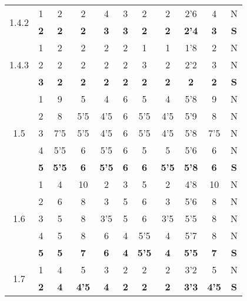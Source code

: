 \documentclass[11pt,a4paper,spanish,twoside]{report}
\begin{document}
\begin{table}[!h]
\begin{tabular}{|c|c||c|c|c|c|c||c|c|c||c|}
    \multirow{2}{*}{1.4.2} & 1 & 2 & 2 & 4 & 3 & 2 & 2 & 2'6 & 4 & N\\
    & \textbf{2} & \textbf{2} & \textbf{2} & \textbf{3} & \textbf{3} & \textbf{2} & \textbf{2} & \textbf{2'4} & \textbf{3} & \textbf{S} \\
    \hline

    \multirow{3}{*}{1.4.3} & 1 & 2 & 2 & 2 & 2 & 1 & 1 & 1'8 & 2 & N\\
    & 2 & 2 & 2 & 2 & 2 & 3 & 2 & 2'2 & 3 & N \\
    & \textbf{3} & \textbf{2} & \textbf{2} & \textbf{2} & \textbf{2} & \textbf{2} & \textbf{2} & \textbf{2} & \textbf{2} & \textbf{S} \\
    \hline

    \multirow{5}{*}{1.5} & 1 & 9 & 5 & 4 & 6 & 5 & 4 & 5'8 & 9 & N \\
    & 2 & 8 & 5'5 & 4'5 & 6 & 5'5 & 4'5 & 5'9 & 8 & N \\
    & 3 & 7'5 & 5'5 & 4'5 & 6 & 5'5 & 4'5 & 5'8 & 7'5 & N \\
    & 4 & 5'5 & 6 & 5'5 & 6 & 5 & 5 & 5'6 & 6 & N \\
    & \textbf{5} & \textbf{5'5} & \textbf{6} & \textbf{5'5} & \textbf{6} & \textbf{6} & \textbf{5'5} & \textbf{5'8} & \textbf{6} & \textbf{S} \\
    \hline

    \multirow{5}{*}{1.6} & 1 & 4 & 10 & 2 & 3 & 5 & 2 & 4'8 & 10 & N \\
    & 2 & 6 & 8 & 3 & 5 & 6 & 3 & 5'6 & 8 & N \\
    & 3 & 5 & 8 & 3'5 & 5 & 6 & 3'5 & 5'5 & 8 & N \\
    & 4 & 5 & 8 & 6 & 4 & 5'5 & 4 & 5'7 & 8 & N \\
    & \textbf{5} & \textbf{5} & \textbf{7} & \textbf{6} & \textbf{4} & \textbf{5'5} & \textbf{4} & \textbf{5'5} & \textbf{7} & \textbf{S} \\
    \hline

    \multirow{2}{*}{1.7} & 1 & 4 & 5 & 3 & 2 & 2 & 2 & 3'2 & 5 & N \\
    & \textbf{2} & \textbf{4} & \textbf{4'5} & \textbf{4} & \textbf{2} & \textbf{2} & \textbf{2} & \textbf{3'3} & \textbf{4'5} & \textbf{S} \\
    \hline


\end{tabular}
\end{table}
\end{document}
